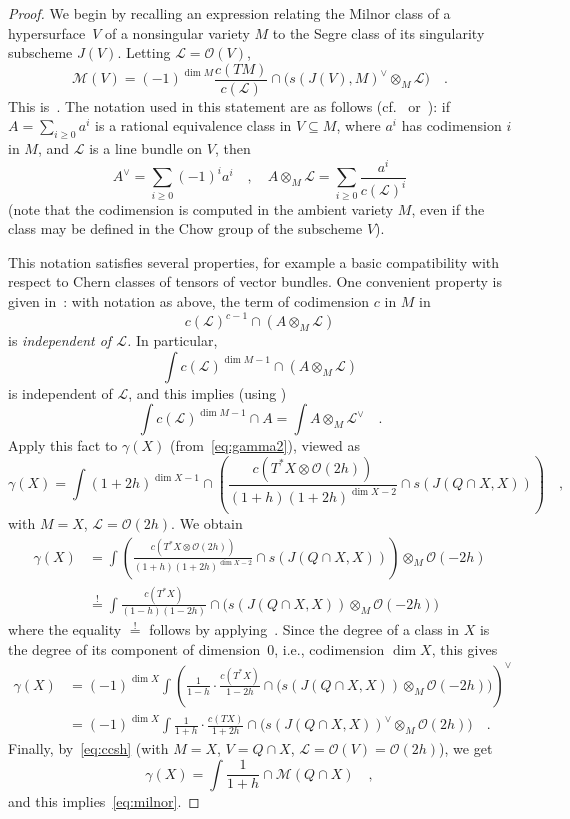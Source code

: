 \documentclass[11pt]{amsart}
\numberwithin{equation}{section}
\newcommand{\cL}{{\mathscr L}}
\newcommand{\cM}{{\mathcal M}}
\newcommand{\cO}{{\mathscr O}}
\begin{document}
\begin{proof}
We begin by recalling an expression relating the Milnor class of a hypersurface~$V$ 
of a nonsingular variety $M$ to the Segre class of its singularity subscheme $J(V)$. 
Letting $\cL=\cO(V)$,
\begin{equation}\label{eq:ccsh}
\cM(V) = (-1)^{\dim M}\frac{c(TM)}{c(\cL)}\cap \big(s(J(V),M)^\vee \otimes_M \cL\big)\quad.
\end{equation}
This is~\cite[Theorem~I.4]{MR2001i:14009}. The notation used in this statement
are as follows (cf.~\cite[\S1.4]{MR2001i:14009} or~\cite[\S2]{MR96d:14004}): if
$A=\sum_{i\ge 0} a^i$ is a rational equivalence class in $V\subseteq M$, where $a^i$
has codimension $i$ in $M$, and $\cL$ is a line bundle on $V$, then
\[
A^\vee = \sum_{i\ge 0} (-1)^i a^i\quad, \quad A\otimes_M \cL = \sum_{i\ge 0} \frac{a^i}{c(\cL)^i}
\]
(note that the codimension is computed in the ambient variety $M$, even if the class
may be defined in the Chow group of the subscheme $V$).

This notation satisfies several properties, for example a basic compatibility with respect
to Chern classes of tensors of vector bundles. One convenient property is given 
in~\cite[Lemma~3.1]{MR3599436}: with notation as above, the term of codimension 
$c$ in $M$ in
\[
c(\cL)^{c-1}\cap (A\otimes_M \cL)
\]
is {\em independent of $\cL$.\/} In particular, 
\[
\int c(\cL)^{\dim M-1} \cap (A\otimes_M \cL)
\]
is independent of $\cL$, and this implies (using \cite[Proposition~2]{MR96d:14004})
\[
\int c(\cL)^{\dim M-1} \cap A =\int A\otimes_M \cL^\vee\quad.
\]
Apply this fact to $\gamma(X)$ (from~\eqref{eq:gamma2}), viewed as 
\[
\gamma(X) = \int (1+2h)^{\dim X-1}\cap \left(
\frac{c(T^*X\otimes \cO(2h))}{(1+h)(1+2h)^{\dim X-2}}\cap s(J(Q\cap X,X))
\right)\quad,
\]
with $M=X$, $\cL=\cO(2h)$. We obtain
\begin{align*}
\gamma(X) &= \int \left(
\frac{c(T^*X\otimes \cO(2h))}{(1+h)(1+2h)^{\dim X-2}}\cap s(J(Q\cap X,X))
\right)\otimes_M \cO(-2h) \\
&\overset != \int 
\frac{c(T^*X)}{(1-h)(1-2h)}\cap 
\big(s(J(Q\cap X,X))\otimes_M \cO(-2h)\big)
\end{align*}
where the equality $\overset !=$ follows by applying~\cite[Proposition~1]{MR96d:14004}.
Since the degree of a class in $X$ is the degree of its component of dimension~$0$,
i.e., codimension $\dim X$, this gives
\begin{align*}
\gamma(X) &= (-1)^{\dim X}\int 
\left(\frac 1{1-h}\cdot \frac{c(T^*X)}{1-2h}\cap \big(s(J(Q\cap X,X))\otimes_M \cO(-2h)\big)\right)^\vee \\
&= (-1)^{\dim X}\int 
\frac 1{1+h}\cdot \frac{c(TX)}{1+2h}\cap \big(s(J(Q\cap X,X))^\vee \otimes_M \cO(2h)\big)\quad.
\end{align*}
Finally, by~\eqref{eq:ccsh} (with $M=X$, $V=Q\cap X$, $\cL=\cO(V)=\cO(2h)$), we get
\[
\gamma(X) = \int \frac 1{1+h}\cap \cM(Q\cap X)\quad,
\]
and this implies~\eqref{eq:milnor}.
\end{proof}
\end{document}
